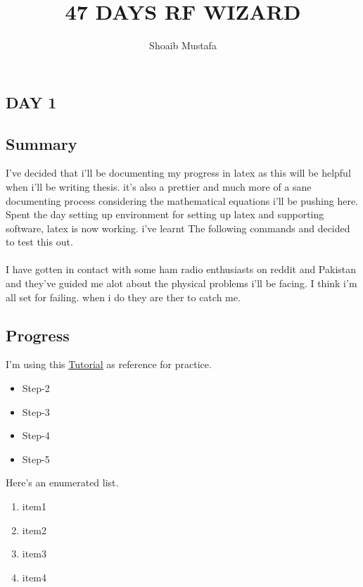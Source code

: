 \documentclass[12pt]{article}
\title{47 DAYS RF WIZARD}
\author{Shoaib Mustafa}
\begin{document}
\maketitle

\begin{center}
    \section*{DAY 1}
\end{center}
\subsection*{Summary}

I've decided that i'll be documenting my progress in latex as this
will be helpful when i'll be writing thesis. it's also a prettier 
and much more of a sane documenting process considering the mathematical
equations i'll be pushing here. Spent the day setting up environment for setting up latex and 
supporting software, latex is now working. i've learnt The
following commands and decided to test this out. \\
\\
I have gotten in contact with some ham radio enthusiasts on reddit
and Pakistan and they've guided me alot about the physical problems
i'll be facing. I think i'm all set for failing. when i do they are ther to catch me.
\\  %
\subsection*{Progress}
I'm using this \underline{\href{https://www.cs.princeton.edu/courses/archive/spr10/cos433/Latex/latex-guide.pdf}{Tutorial}}
as reference for practice.
\label{lists} %
\begin{itemize}
    \item Step-2
    \item Step-3
    \item Step-4
    \item Step-5
\end{itemize}
Here's an enumerated list.
\begin{enumerate}
    \item item1 
    \item item2
    \item item3
    \item item4
\end{enumerate}
\end{document}
